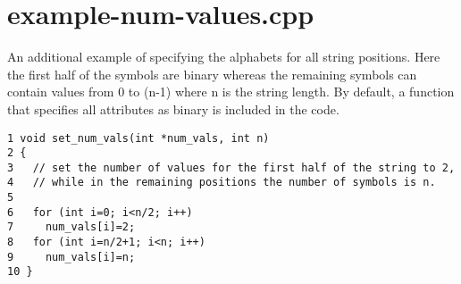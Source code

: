 \hypertarget{example-num-values_8cpp-example}{
\section{example-num-values.cpp}
}
An additional example of specifying the alphabets for all string positions. Here the first half of the symbols are binary whereas the remaining symbols can contain values from 0 to (n-1) where n is the string length. By default, a function that specifies all attributes as binary is included in the code.



\begin{DocInclude}\begin{verbatim}1 void set_num_vals(int *num_vals, int n)
2 {
3   // set the number of values for the first half of the string to 2,
4   // while in the remaining positions the number of symbols is n.
5 
6   for (int i=0; i<n/2; i++)
7     num_vals[i]=2;
8   for (int i=n/2+1; i<n; i++)
9     num_vals[i]=n;
10 }
\end{verbatim}
\end{DocInclude}
 